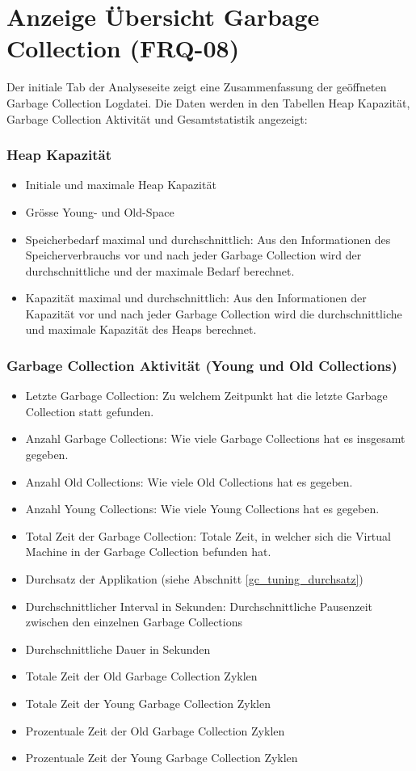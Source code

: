 \section{Anzeige Übersicht Garbage Collection (FRQ-08)}\label{standardreport}
Der initiale Tab der Analyseseite zeigt eine Zusammenfassung der geöffneten Garbage Collection Logdatei. Die Daten werden in den Tabellen Heap Kapazität, Garbage Collection Aktivität und Gesamtstatistik angezeigt:

\subsubsection{Heap Kapazität}
\begin{itemize}
	\item Initiale und maximale Heap Kapazität
	\item Grösse Young- und Old-Space
	\item Speicherbedarf maximal und durchschnittlich: Aus den Informationen des Speicherverbrauchs vor und nach jeder Garbage Collection wird der durchschnittliche und der maximale Bedarf berechnet.
	\item Kapazität maximal und durchschnittlich: Aus den Informationen der Kapazität vor und nach jeder Garbage Collection wird die durchschnittliche und maximale Kapazität des Heaps berechnet.

\end{itemize}
\subsubsection{Garbage Collection Aktivität (Young und Old Collections)}
\begin{itemize}
	\item Letzte Garbage Collection: Zu welchem Zeitpunkt hat die letzte Garbage Collection statt gefunden.
	\item Anzahl Garbage Collections: Wie viele Garbage Collections hat es insgesamt gegeben.
	\item  Anzahl Old Collections: Wie viele Old Collections hat es gegeben.
	\item Anzahl Young Collections: Wie viele Young Collections hat es gegeben.
	\item Total Zeit der Garbage Collection: Totale Zeit, in welcher sich die Virtual Machine in der Garbage Collection befunden hat.
	\item Durchsatz der Applikation (siehe Abschnitt \ref{gc_tuning_durchsatz})

	\item Durchschnittlicher Interval in Sekunden: Durchschnittliche Pausenzeit zwischen den einzelnen Garbage Collections
	\item Durchschnittliche Dauer in Sekunden
	\item Totale Zeit der Old Garbage Collection Zyklen
	\item Totale Zeit der Young Garbage Collection Zyklen
	\item Prozentuale Zeit der Old Garbage Collection Zyklen
	\item Prozentuale Zeit der Young Garbage Collection Zyklen
\end{itemize}	

